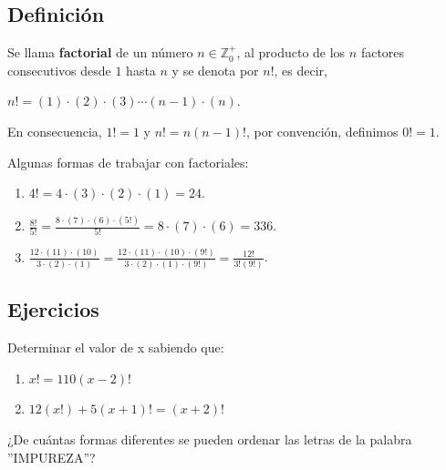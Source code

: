 \documentclass[12pt]{article}
\begin{document}
\subsection{Definición}

\begin{definicion}
    Se llama \textbf{factorial} de un número $n \in \mathbb{Z}^+_0$, al producto de los $n$ factores consecutivos desde $1$ hasta $n$ y se denota por $n!$, es decir,
\end{definicion}

\begin{center}
    $n! = (1)\cdot (2)\cdot (3)\cdots (n-1)\cdot (n)$.
\end{center}

En consecuencia, $1!=1$ y $n!=n(n-1)!$, por convención, definimos $0!=1$.

\begin{ejemplo}
    Algunas formas de trabajar con factoriales:
    \renewcommand{\labelenumi}{\alph{enumi})}
    \begin{enumerate}
        \item $4! = 4 \cdot (3) \cdot (2) \cdot (1) = 24$.
        \item $\frac{8!}{5!}= \frac{8 \cdot (7)\cdot (6)\cdot  (5!)}{5!}= 8 \cdot (7)\cdot  (6) = 336$.
        \item $\frac{12 \cdot(11)\cdot (10)}{3\cdot (2)\cdot (1)}= \frac{12\cdot (11) \cdot(10)\cdot (9!)}{3\cdot (2)\cdot (1)\cdot (9!)}= \frac{12!}{3! (9!)}$.
    \end{enumerate}
\end{ejemplo}

\subsection{Ejercicios}

\begin{ejercicio}
    Determinar el valor de x sabiendo que:
    \renewcommand{\labelenumi}{\alph{enumi})}
    \begin{enumerate}
        \item $x! = 110 (x-2)!$
        \item $12 (x!) + 5 (x+1)!=(x+2)!$
    \end{enumerate}
\end{ejercicio}

\begin{ejercicio}
    ¿De cuántas formas diferentes se pueden ordenar las letras de la palabra ''IMPUREZA''?
\end{ejercicio}
\end{document}
